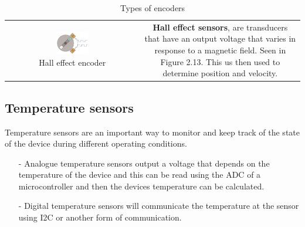 \begin{table}[H]
\begin{tabular}{|c|c|}
\begin{minipage}[b]{0.49\textwidth}
 
        \end{minipage}
         \\
         \hline
          \begin{minipage}[b]{0.49\textwidth}
          \centering
          \begin{figure}[H]
          \centering
             \includegraphics[width=0.4\textwidth]{Halleffect.png}
             \caption{Hall effect encoder}
             \label{fig:hallenc}
          \end{figure}
         \end{minipage}
         &
          \begin{minipage}[b]{0.49\textwidth}
          \vspace{5mm}
          \textbf{Hall effect sensors}, are transducers that have an output voltage that varies in response to a magnetic field. Seen in Figure
          2.13. This us then used to determine position and velocity\cite{halleffect}. 
          \vspace{5mm}
          \end{minipage}
         \\
         
     \hline
    \end{tabular}
    \vspace{-4mm}
    \caption{Types of encoders}
\end{table}
\vspace{-10mm}



\newpage
\subsection{Temperature sensors}
Temperature sensors are an important way to monitor and keep track of the state of the device during different operating conditions.

\begin{itemize}
	\item[-]Analogue temperature sensors output a voltage that depends on the temperature of the device and this can be read using the ADC of a microcontroller and then the devices temperature can be calculated. 
    \item[-]Digital temperature sensors will communicate the temperature at the sensor using I2C or another form of communication.
\end{itemize}

